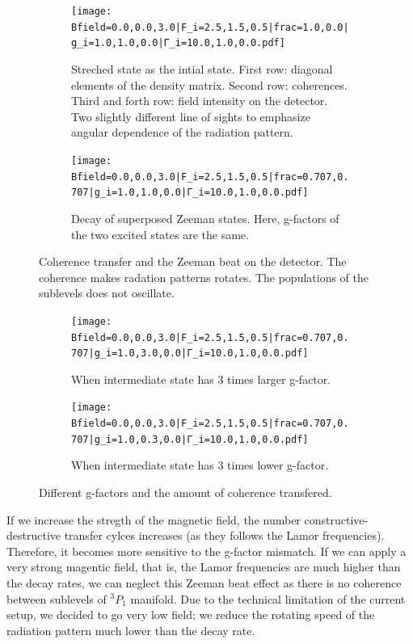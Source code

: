\documentclass{article}
\begin{document}
\begin{figure}[h!]
    \centering
    \begin{subfigure}[a]{.7\linewidth}
    \texttt{[image: Bfield=0.0,0.0,3.0|F\_i=2.5,1.5,0.5|frac=1.0,0.0|g\_i=1.0,1.0,0.0|Γ\_i=10.0,1.0,0.0.pdf]}
    \caption{Streched state as the intial state. First row: diagonal elements of the density matrix. Second row: coherences. Third and forth row: field intensity on the detector. Two slightly different line of sights to emphasize angular dependence of the radiation pattern.}
    \end{subfigure}

    \begin{subfigure}[b]{.7\linewidth}
    \texttt{[image: Bfield=0.0,0.0,3.0|F\_i=2.5,1.5,0.5|frac=0.707,0.707|g\_i=1.0,1.0,0.0|Γ\_i=10.0,1.0,0.0.pdf]}
    \caption{Decay of superposed Zeeman states. Here, g-factors of the two excited states are the same.}
    \end{subfigure}
    \caption{Coherence transfer and the Zeeman beat on the detector. The coherence makes radation patterns rotates. The populations of the sublevels does not oscillate. \label{fig:Zeemanbeat1}}
\end{figure}

\begin{figure}[h]
    \centering
    \begin{subfigure}[a]{.7\linewidth}
    \texttt{[image: Bfield=0.0,0.0,3.0|F\_i=2.5,1.5,0.5|frac=0.707,0.707|g\_i=1.0,3.0,0.0|Γ\_i=10.0,1.0,0.0.pdf]}
    \caption{When intermediate state has 3 times larger g-factor.}
    \end{subfigure}
    \begin{subfigure}[b]{.7\linewidth}
    \texttt{[image: Bfield=0.0,0.0,3.0|F\_i=2.5,1.5,0.5|frac=0.707,0.707|g\_i=1.0,0.3,0.0|Γ\_i=10.0,1.0,0.0.pdf]}
    \caption{When intermediate state has 3 times lower g-factor.}
    \end{subfigure}
    \caption{Different g-factors and the amount of coherence transfered. \label{fig:Zeemanbeat2}}
\end{figure}
\clearpage

If we increase the stregth of the magnetic field, the number constructive-destructive transfer cylces increases (as they follows the Lamor frequencies). Therefore, it becomes more sensitive to the g-factor mismatch. If we can apply a very strong magentic field, that is, the Lamor frequencies are much higher than the decay rates, we can neglect this Zeeman beat effect as there is no coherence between sublevels of $^3P_1$ manifold. Due to the technical limitation of the current setup, we decided to go very low field; we reduce the rotating speed of the radiation pattern much lower than the decay rate. 
\end{document}
